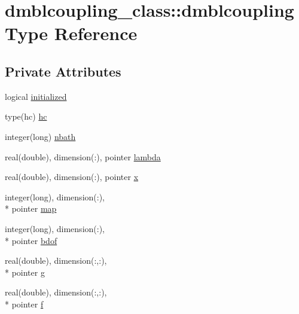 \hypertarget{structdmblcoupling__class_1_1dmblcoupling}{\section{dmblcoupling\+\_\+class\+:\+:dmblcoupling Type Reference}
\label{structdmblcoupling__class_1_1dmblcoupling}
}
\subsection*{Private Attributes}
\begin{DoxyCompactItemize}
\item 
logical \hyperlink{structdmblcoupling__class_1_1dmblcoupling_a55615fead5adac69667c3bb15c6e6ac0}{initialized}
\item 
type(hc) \hyperlink{structdmblcoupling__class_1_1dmblcoupling_acdf924bcf32d4a331ae9d534f789aacf}{hc}
\item 
integer(long) \hyperlink{structdmblcoupling__class_1_1dmblcoupling_a47d1326bbe0df2e2b1477a52f0f4c27f}{nbath}
\item 
real(double), dimension(\+:), pointer \hyperlink{structdmblcoupling__class_1_1dmblcoupling_a78564435f9d342fbbd045dee6421d1bd}{lambda}
\item 
real(double), dimension(\+:), pointer \hyperlink{structdmblcoupling__class_1_1dmblcoupling_a4f3f155bd46c7ed8e0f3f5fe8447e94d}{x}
\item 
integer(long), dimension(\+:), \\*
pointer \hyperlink{structdmblcoupling__class_1_1dmblcoupling_ad07466117459e4dd4d4b3fd1a2a3ef0b}{map}
\item 
integer(long), dimension(\+:), \\*
pointer \hyperlink{structdmblcoupling__class_1_1dmblcoupling_af46ed740fbaeb310adfb63d24c789686}{bdof}
\item 
real(double), dimension(\+:,\+:), \\*
pointer \hyperlink{structdmblcoupling__class_1_1dmblcoupling_ac53af7cb58835be9fb0c569ecfa1c25e}{g}
\item 
real(double), dimension(\+:,\+:), \\*
pointer \hyperlink{structdmblcoupling__class_1_1dmblcoupling_adf77a7cf987910e98f8f368406a8257f}{f}
\end{DoxyCompactItemize}


